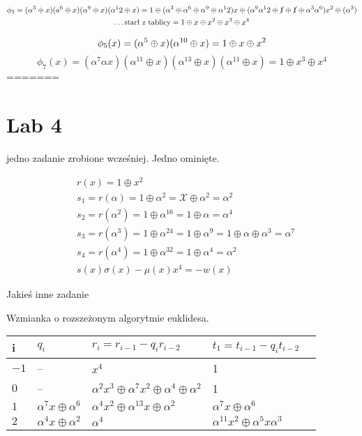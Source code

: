 \documentclass[12pt]{article}
\begin{document}
\begin{multline*}
    \phi_3 = (\alpha^3 \oplus x) (a^6 \oplus x)(\alpha^9 \oplus x)(\alpha^12 \oplus x)  
    = 1 \oplus (\alpha^3 \oplus \alpha ^6 \oplus \alpha^9 \oplus \alpha^12)x 
    \oplus (\alpha^9 \alpha^12 \oplus \cancel{1} \oplus \cancel{1} \oplus \alpha^3 
    \alpha ^6)x^2 \oplus (\alpha^3 ) \\ 
    \dots \text{starł z tablicy}  = 1 \oplus x \oplus x^2 \oplus x^3 \oplus x^4
\end{multline*}

 $$   \phi_5(x) = (\alpha^5 \oplus x)(\alpha^{10} \oplus x) = 1 \oplus x \oplus  x^2 \\ $$
 $$   \phi_7(x) = (\alpha^7 \alpha x)(\alpha^11 \oplus x)(\alpha^13 \oplus x)(\alpha^11 \oplus x) = 1\oplus x^3 \oplus x^4 $$
=======

\section*{Lab 4}

jedno zadanie zrobione wcześniej. Jedno ominięte.


\begin{multline*}
    & r(x) = 1 \oplus x^2 \\ 
    & s_1 = r(\alpha) = 1 \oplus \alpha^2  = \mathcal{X} \oplus \alpha ^2 = \alpha^2 \\
    & s_2 = r(\alpha^2) = 1\oplus \alpha ^{16} = 1\oplus \alpha = \alpha ^4  \\
    & s_3 = r(\alpha ^3) =1 \oplus \alpha ^{24} = 1\oplus \alpha^9 = 1 \oplus \alpha \oplus \alpha^3 = \alpha^7  \\
    & s_4 = r(\alpha^4) = 1\oplus \alpha ^{32} = 1 \oplus \alpha^4 = \alpha^2 \\
    & s(x)\sigma(x) - \mu(x)x^4 = - w(x)
\end{multline*}


Jakieś inne zadanie

Wzmianka o rozszeżonym algorytmie euklidesa. 

\begin{table}[h]
\begin{tabular}{lllll}
    i & $q_i$ & $r_i = r_{i-1} - q_ir_{i-2} $ & $t_1 = t_{i-1}-q_it_{i-2}$ &  \\ \hline
    $-1$ & --                           & $x^4$                                                         & 1 &    \\
    $0$  & --                           & $\alpha^2x^3\oplus\alpha^7x^2\oplus\alpha^4 \oplus \alpha^2 $ & 1  &    \\
    $1$  & $\alpha^7x \oplus \alpha^6 $ & $\alpha^4 x^2 \oplus \alpha ^{13}x \oplus \alpha ^2 $         & $\alpha^7x\oplus\alpha^6$  & \\  
    $2 $ & $\alpha^4x\oplus\alpha^2$    & $\alpha^4$                                                    & $\alpha^{11}x^2\oplus\alpha^5x\alpha^3$
\end{tabular}
\end{table}
\end{document}

